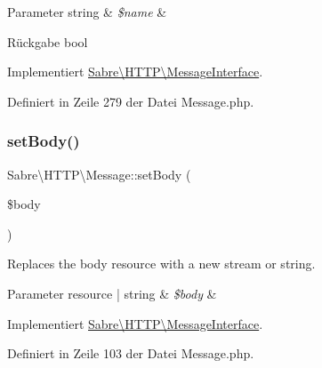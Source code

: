 \begin{DoxyParams}[1]{Parameter}
string & {\em \$name} & \\
\hline
\end{DoxyParams}
\begin{DoxyReturn}{Rückgabe}
bool 
\end{DoxyReturn}


Implementiert \mbox{\hyperlink{interface_sabre_1_1_h_t_t_p_1_1_message_interface_a8753c1a48f9b80b341983bc414fbd85d}{Sabre\textbackslash{}\+H\+T\+T\+P\textbackslash{}\+Message\+Interface}}.



Definiert in Zeile 279 der Datei Message.\+php.

\mbox{\label{class_sabre_1_1_h_t_t_p_1_1_message_aef29d4593bbe2debd17bfbcd501e5dcd}} 
\subsubsection{\texorpdfstring{set\+Body()}{setBody()}}
{\footnotesize\ttfamily Sabre\textbackslash{}\+H\+T\+T\+P\textbackslash{}\+Message\+::set\+Body (\begin{DoxyParamCaption}\item[{}]{\$body }\end{DoxyParamCaption})}

Replaces the body resource with a new stream or string.


\begin{DoxyParams}[1]{Parameter}
resource | string & {\em \$body} & \\
\hline
\end{DoxyParams}


Implementiert \mbox{\hyperlink{interface_sabre_1_1_h_t_t_p_1_1_message_interface_a9bda348f19928cf4972ba2835d0be73c}{Sabre\textbackslash{}\+H\+T\+T\+P\textbackslash{}\+Message\+Interface}}.



Definiert in Zeile 103 der Datei Message.\+php.

\mbox{\label{class_sabre_1_1_h_t_t_p_1_1_message_a81f40ecdcfb4dfad362f800a5be8813c}} 
